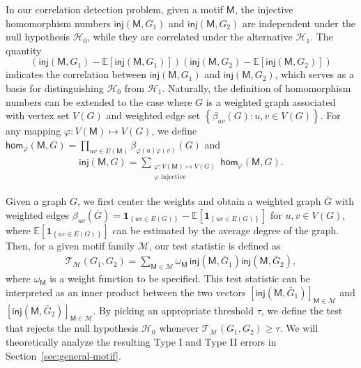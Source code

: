 \documentclass[letterpaper,11pt]{article}
\theoremstyle{definition}
\newcommand{\maG}{\mathcal{G}}
\newcommand{\maH}{\mathcal{H}}
\newcommand{\maM}{\mathcal{M}}
\newcommand{\maT}{\mathcal{T}}
\newcommand{\expect}[1]{ \mathbb{E}\left[ #1 \right] }
\newcommand{\pth}[1]{\left( #1 \right)}
\newcommand{\qth}[1]{\left[ #1 \right]}
\newcommand{\sth}[1]{\left\{ #1 \right\}}
\newcommand{\sfM}{{\mathsf{M}}}
\newcommand{\indc}[1]{{\mathbf{1}_{\left\{{#1}\right\}}}}
\newcommand{\ER}{Erd\H{o}s-R\'enyi }
\renewcommand{\hom}{\mathsf{hom}}
\newcommand{\inj}{\mathsf{inj}}
\begin{document}
In our correlation detection problem, given a motif $\sfM$, the injective homomorphism numbers $\inj(\sfM,G_1)$ and $\inj(\sfM,G_2)$ are independent under the null hypothesis $\maH_0$, while they are correlated under the alternative $\maH_1$. 
The quantity $$\pth{\inj(\sfM,G_1)-\expect{\inj(\sfM,G_1)}}\pth{\inj(\sfM,G_2)-\expect{\inj(\sfM,G_2)}}$$ indicates the correlation between $\inj(\sfM,G_1)$ and $\inj(\sfM,G_2)$, which serves as a basis for distinguishing $\maH_0$ from $\maH_1$.
Naturally, the definition of homomorphism numbers can be extended to the case where $G$ is a weighted graph associated with vertex set $V(G)$ and weighted edge set $\sth{\beta_{uv}(G):u,v\in V(G)}$. For any mapping $\varphi:V(\sfM)\mapsto V(G)$, we define $\hom_\varphi(\sfM,G) = \prod_{uv\in E(\sfM)}\beta_{\varphi(u)\varphi(v)}(G)$ and \begin{align}\label{eq:def_of_inj}
    \inj(\sfM,G) = \sum_{\substack{\varphi:V(\sfM)\mapsto V(G)\\\varphi\text{ injective}}} \hom_\varphi(\sfM,G).
\end{align}



Given a graph $G$, we first center the weights and obtain a weighted graph $\bar{G}$ with weighted edges 
$\beta_{uv}(\bar{G}) = \indc{uv\in E(G)} - \expect{\indc{uv\in E(G)}}$ for $u,v\in V(G)$, where $\expect{\indc{uv\in E(G)}}$ can be estimated by the average degree of the graph. 
Then, for a given motif family $\maM$, our test statistic is defined as \begin{align}\label{eq:est-sub-count}
    \maT_{\maM }\pth{G_1,G_2} = \sum_{\sfM \in \maM } \omega_\sfM\, \inj(\sfM,\bar{G}_1)\inj(\sfM,\bar{G}_2),
\end{align}
where $\omega_\sfM$ is a weight function to be specified.
This test statistic can be interpreted as an inner product between the two vectors $\qth{\inj(\sfM,\bar{G}_1)}_{\sfM\in \maM}$ and $\qth{\inj(\sfM,\bar{G}_2)}_{\sfM\in \maM}$. 
By picking an appropriate threshold $\tau$, we define the test that rejects the null hypothesis $\maH_0$ whenever $\maT_\maM(G_1,G_2)\ge \tau$. We will theoretically analyze the resulting Type I and Type II errors in Section~\ref{sec:general-motif}.
\end{document}
